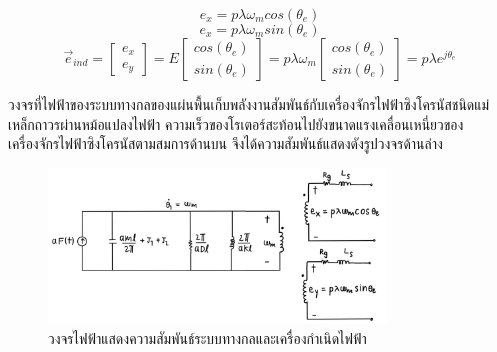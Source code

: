 \documentclass[11pt,a4paper]{article}
\begin{document}
\begin{equation}
    e_{x} = p \lambda \omega_{m} cos(\theta_{e})
\end{equation}
\begin{equation}
    e_{x} = p \lambda \omega_{m} sin(\theta_{e})
\end{equation}
\begin{equation}
    \vec{e}_{ind} =
    \begin{bmatrix}
        e_{x} \\ e_{y}
    \end{bmatrix} = E
    \begin{bmatrix}
        cos(\theta_{e}) \\ sin(\theta_{e})
    \end{bmatrix} = p \lambda \omega_{m}
    \begin{bmatrix}
        cos(\theta_{e}) \\ sin(\theta_{e})
    \end{bmatrix} =
    p \lambda e^{j\theta_{e}}
\end{equation}

วงจรที่ไฟฟ้าของระบบทางกลของแผ่นพื้นเก็บพลังงานสัมพันธ์กับเครื่องจักรไฟฟ้าซิงโครนัสชนิดแม่เหล็กถาวรผ่านหม้อแปลงไฟฟ้า ความเร็วของโรเตอร์สะท้อนไปยังขนาดแรงเคลื่อนเหนี่ยวของเครื่องจักรไฟฟ้าซิงโครนัสตามสมการด้านบน จึงได้ความสัมพันธ์แสดงดังรูปวงจรด้านล่าง
\begin{figure}[H]
    \begin{center}
        \includegraphics[width=0.8\textwidth]{cir_mech_elec_1n.jpg}
    \end{center}
    \caption{วงจรไฟฟ้าแสดงความสัมพันธ์ระบบทางกลและเครื่องกำเนิดไฟฟ้า}
    \label{cir_mech_elec_1n}
\end{figure}
\end{document}
